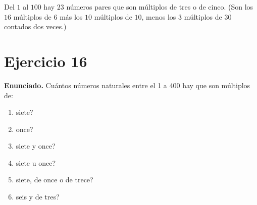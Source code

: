 \documentclass[11pt]{article}
\begin{document}
\begin{resp}
Del $1$ al $100$ hay $\boxed{23}$ n\'umeros pares que son m\'ultiplos de tres o de cinco.
(Son los $16$ m\'ultiplos de $6$ m\'as los $10$ m\'ultiplos de $10$, menos los $3$ m\'ultiplos de $30$ contados dos veces.)
\end{resp}

\newpage

\section*{Ejercicio 16}

\textbf{Enunciado.} Cu\'antos n\'umeros naturales entre el 1 a 400 hay que son m\'ultiplos de:
\begin{enumerate}[label=(\alph*),leftmargin=*]
\item siete?
\item once?
\item siete y once?
\item siete u once?
\item siete, de once o de trece?
\item seis y de tres?
\end{enumerate}
\end{document}
